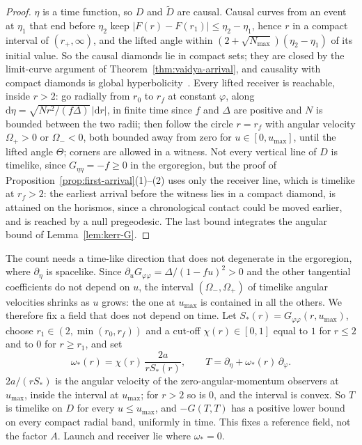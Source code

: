 \documentclass[aip,jmp,amsmath,amssymb,reprint]{revtex4-2}
\newcommand{\dd}{\mathrm{d}}
\theoremstyle{plain}
\theoremstyle{definition}
\begin{document}
\begin{proof}
$\eta$ is a time function, so $D$ and $\tilde D$ are causal. Causal curves from an event at $\eta_1$ that
end before $\eta_2$ keep $|F(r)-F(r_1)|\le\eta_2-\eta_1$, hence $r$ in a compact interval of
$(r_+,\infty)$, and the lifted angle within $(2+\sqrt{N_{\max}})(\eta_2-\eta_1)$ of its initial value. So the
causal diamonds lie in compact sets; they are closed by the limit-curve argument of
Theorem~\ref{thm:vaidya-arrival}, and causality with compact diamonds is global
hyperbolicity~\cite{BernalSanchez2007}. Every lifted receiver is reachable, inside $r>2$: go radially
from $r_0$ to $r_f$ at constant $\varphi$, along $\dd\eta=\sqrt{Nr^2/(f\Delta)}\,|\dd r|$, in finite time since $f$
and $\Delta$ are positive and $N$ is bounded between the two radii; then follow the circle $r=r_f$
with angular velocity $\Omega_+>0$ or $\Omega_-<0$, both bounded away from zero for $u\in[0,u_{\max}]$, until
the lifted angle $\Theta$; corners are allowed in a witness. Not every vertical line of $D$ is timelike,
since $G_{\eta\eta}=-f\ge0$ in the ergoregion, but the proof of
Proposition~\ref{prop:first-arrival}(1)--(2) uses only the receiver line, which is timelike at $r_f>2$:
the earliest arrival before the witness lies in a compact diamond, is attained on the horismos,
since a chronological contact could be moved earlier, and is reached by a null pregeodesic. The
last bound integrates the angular bound of Lemma~\ref{lem:kerr-G}.
\end{proof}

The count needs a time-like direction that does not degenerate in the ergoregion, where
$\partial_\eta$ is spacelike. Since $\partial_uG_{\varphi\varphi}=\Delta/(1-fu)^2>0$ and the other tangential coefficients do not
depend on $u$, the interval $(\Omega_-,\Omega_+)$ of timelike angular velocities shrinks as $u$ grows: the one
at $u_{\max}$ is contained in all the others. We therefore fix a field that does not depend on time.
Let $S_*(r)=G_{\varphi\varphi}(r,u_{\max})$, choose $r_1\in(2,\min(r_0,r_f))$ and a cut-off $\chi(r)\in[0,1]$ equal to $1$
for $r\le2$ and to $0$ for $r\ge r_1$, and set
\[
  \omega_*(r)=\chi(r)\,\frac{2a}{rS_*(r)},\qquad T=\partial_\eta+\omega_*(r)\,\partial_\varphi .
\]
$2a/(rS_*)$ is the angular velocity of the zero-angular-momentum observers at $u_{\max}$, inside the
interval at $u_{\max}$; for $r>2$ so is $0$, and the interval is convex. So $T$ is timelike on $D$ for
every $u\le u_{\max}$, and $-G(T,T)$ has a positive lower bound on every compact radial band, uniformly
in time. This fixes a reference field, not the factor $A$. Launch and receiver lie where
$\omega_*=0$.
\end{document}
